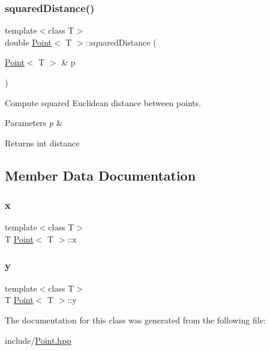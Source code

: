 \subsubsection{\texorpdfstring{squared\+Distance()}{squaredDistance()}}
{\footnotesize\ttfamily template$<$class T$>$ \\
double \mbox{\hyperlink{classPoint}{Point}}$<$ T $>$\+::squared\+Distance (\begin{DoxyParamCaption}\item[{\mbox{\hyperlink{classPoint}{Point}}$<$ T $>$ \&}]{p }\end{DoxyParamCaption})\hspace{0.3cm}{\ttfamily [inline]}}



Compute squared Euclidean distance between points. 


\begin{DoxyParams}{Parameters}
{\em p} & \\
\hline
\end{DoxyParams}
\begin{DoxyReturn}{Returns}
int distance 
\end{DoxyReturn}


\subsection{Member Data Documentation}
\mbox{\label{classPoint_a401d07562afaf0079121218025e66b76}} 
\subsubsection{\texorpdfstring{x}{x}}
{\footnotesize\ttfamily template$<$class T$>$ \\
T \mbox{\hyperlink{classPoint}{Point}}$<$ T $>$\+::x}

\mbox{\label{classPoint_a65146418a33ebb2cd9acb85cade60ac9}} 
\subsubsection{\texorpdfstring{y}{y}}
{\footnotesize\ttfamily template$<$class T$>$ \\
T \mbox{\hyperlink{classPoint}{Point}}$<$ T $>$\+::y}



The documentation for this class was generated from the following file\+:\begin{DoxyCompactItemize}
\item 
include/\mbox{\hyperlink{Point_8hpp}{Point.\+hpp}}\end{DoxyCompactItemize}
